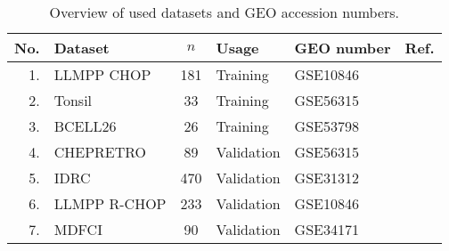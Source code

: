 \begin{table}%
\small
\caption{Overview of used datasets and GEO accession numbers.}
\label{table:01}%
\begin{center}
\begin{tabular}{rlclll}
\hline\hline
No. & Dataset & $n$ & Usage & GEO number & Ref.
\\
\hline
1. & LLMPP CHOP & 181 & Training & GSE10846 & \citep{Lenz2008a}
\\
2. & Tonsil & 33 & Training & GSE56315 & \citep{DybkaerBoegsted2015}
\\
3. & BCELL26 & 26 & Training & GSE53798 & \citep{Falgreen2015}
\\
4. & CHEPRETRO & 89 & Validation & GSE56315 & \citep{DybkaerBoegsted2015}
\\
5. & IDRC & 470 & Validation & GSE31312 & \citep{Visco2012}
\\
6. & LLMPP R-CHOP & 233 & Validation & GSE10846 & \citep{Lenz2008a}
\\
7. & MDFCI & 90 & Validation & GSE34171 & \citep{Monti2012a}\\
\hline
\end{tabular}
\end{center}
\end{table}

